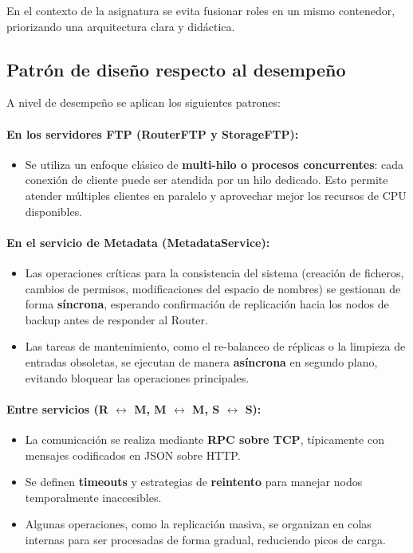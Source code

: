 \documentclass{article}
\begin{document}
En el contexto de la asignatura se evita fusionar roles en un mismo contenedor, priorizando una arquitectura clara y didáctica.

\subsection{Patrón de diseño respecto al desempeño}
A nivel de desempeño se aplican los siguientes patrones:

\paragraph{En los servidores FTP (RouterFTP y StorageFTP):}
\begin{itemize}
    \item Se utiliza un enfoque clásico de \textbf{multi-hilo o procesos concurrentes}: cada conexión de cliente puede ser atendida por un hilo dedicado. Esto permite atender múltiples clientes en paralelo y aprovechar mejor los recursos de CPU disponibles.
\end{itemize}

\paragraph{En el servicio de Metadata (MetadataService):}
\begin{itemize}
    \item Las operaciones críticas para la consistencia del sistema (creación de ficheros, cambios de permisos, modificaciones del espacio de nombres) se gestionan de forma \textbf{síncrona}, esperando confirmación de replicación hacia los nodos de backup antes de responder al Router.
    \item Las tareas de mantenimiento, como el re-balanceo de réplicas o la limpieza de entradas obsoletas, se ejecutan de manera \textbf{asíncrona} en segundo plano, evitando bloquear las operaciones principales.
\end{itemize}

\paragraph{Entre servicios (R $\leftrightarrow$ M, M $\leftrightarrow$ M, S $\leftrightarrow$ S):}
\begin{itemize}
    \item La comunicación se realiza mediante \textbf{RPC sobre TCP}, típicamente con mensajes codificados en JSON sobre HTTP.
    \item Se definen \textbf{timeouts} y estrategias de \textbf{reintento} para manejar nodos temporalmente inaccesibles.
    \item Algunas operaciones, como la replicación masiva, se organizan en colas internas para ser procesadas de forma gradual, reduciendo picos de carga.
\end{itemize}
\end{document}

